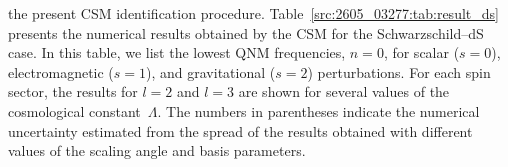 the present CSM identification procedure.
Table~\ref{src:2605_03277:tab:result_ds} presents the numerical
results obtained by the CSM for the Schwarzschild--dS case.
In this table, we list the lowest QNM frequencies, $n=0$, for scalar
($s=0$), electromagnetic ($s=1$), and gravitational ($s=2$) perturbations.
For each spin sector, the results for $l=2$ and $l=3$ are shown for several
values of the cosmological constant~$\Lambda$.
The numbers in parentheses indicate the numerical uncertainty estimated from
the spread of the results obtained with different values of the scaling angle
and basis parameters.
